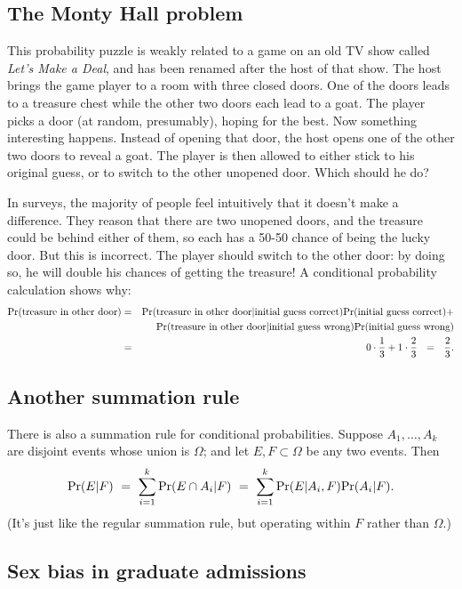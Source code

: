 \subsection{The Monty Hall problem}

This probability puzzle is weakly related to a game on an old TV show called {\it Let's Make a Deal}, and has been renamed after the host of that show. The host brings the game player to a room with three closed doors. One of the doors leads to a treasure chest while the other two doors each lead to a goat. The player picks a door (at random, presumably), hoping for the best. Now something interesting happens. Instead of opening that door, the host opens one of the other two doors to reveal a goat. The player is then allowed to either stick to his original guess, or to switch to the other unopened door. Which should he do?

In surveys, the majority of people feel intuitively that it doesn't make a difference. They reason that there are two unopened doors, and the treasure could be behind either of them, so each has a 50-50 chance of being the lucky door. But this is incorrect. The player should switch to the other door: by doing so, he will double his chances of getting the treasure! A conditional probability calculation shows why:
\begin{eqnarray*}
\pr(\mbox{treasure in other door}) 
& = & 
\pr(\mbox{treasure in other door} | \mbox{initial guess correct}) \pr(\mbox{initial guess correct}) + \\
& & \pr(\mbox{treasure in other door} | \mbox{initial guess wrong}) \pr(\mbox{initial guess wrong}) \\
& = & 
0 \cdot \frac{1}{3} + 1 \cdot \frac{2}{3} 
\ \ = \ \ 
\frac{2}{3} .
\end{eqnarray*}

\subsection{Another summation rule}

There is also a summation rule for conditional probabilities. Suppose $A_1, \ldots, A_k$ are disjoint events whose union is $\Omega$; and let $E,F \subset \Omega$ be any two events. Then
$$ \pr(E | F) 
\ = \ 
\sum_{i=1}^k \pr(E \cap A_i | F) 
\ = \ 
\sum_{i=1}^k \pr(E | A_i, F) \pr(A_i|F).
$$
(It's just like the regular summation rule, but operating within $F$ rather than $\Omega$.)

\subsection{Sex bias in graduate admissions}

